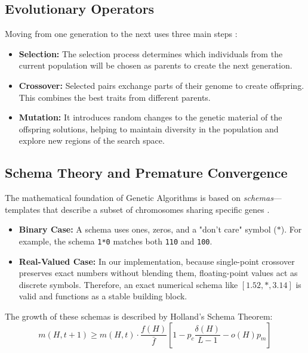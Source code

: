 \documentclass[conference]{IEEEtran}
\begin{document}
    \subsection{Evolutionary Operators}
    Moving from one generation to the next uses three main steps \cite{b1}:
    \begin{itemize}
        \item \textbf{Selection:} The selection process determines which individuals from the current population will be chosen as parents to create the next generation.
        \item \textbf{Crossover:} Selected pairs exchange parts of their genome to create offspring. This combines the best traits from different parents.
        \item \textbf{Mutation:} It introduces random changes to the genetic material of the offspring solutions, helping to maintain diversity in the population and explore new regions of the search space.
    \end{itemize}

    \subsection{Schema Theory and Premature Convergence}
        The mathematical foundation of Genetic Algorithms is based on \textit{schemas}---templates that describe a subset of chromosomes sharing specific genes \cite{b2, b3}.

        \begin{itemize}
            \item \textbf{Binary Case:} A schema uses ones, zeros, and a "don't care" symbol ($*$). For example, the schema \texttt{1*0} matches both \texttt{110} and \texttt{100}.
            \item \textbf{Real-Valued Case:} In our implementation, because single-point crossover preserves exact numbers without blending them, floating-point values act as discrete symbols. Therefore, an exact numerical schema like $[1.52, *, 3.14]$ is valid and functions as a stable building block.
        \end{itemize}

        The growth of these schemas is described by Holland's Schema Theorem:
        \begin{equation}
            m(H, t+1) \ge m(H, t) \cdot \frac{f(H)}{\bar{f}} \left[ 1 - p_c \frac{\delta(H)}{L-1} - o(H)p_m \right]
        \end{equation}
\end{document}
